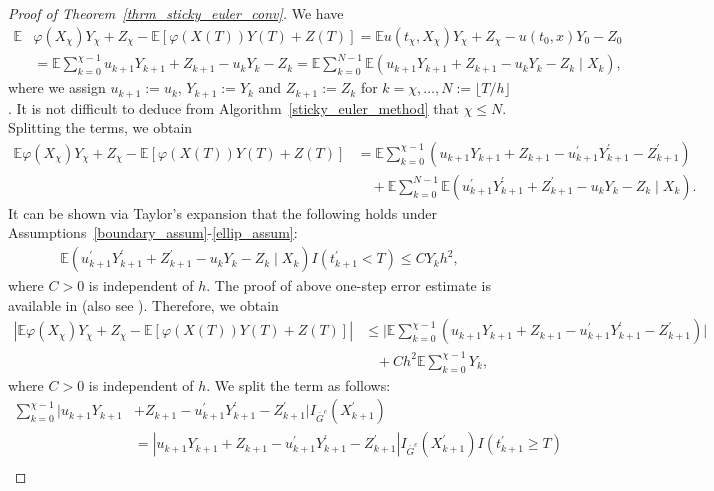 \documentclass{article}
\theoremstyle{definition}
\numberwithin{equation}{section}
\begin{document}
 
\begin{proof}[Proof of Theorem~\ref{thrm_sticky_euler_conv}]
We have
\begin{align*}
    \mathbb{E}&\varphi (X_\chi)Y_{\chi} + Z_{\chi} - \mathbb{E}[\varphi(X(T))Y(T)+ Z(T)] =   \mathbb{E}u(t_\chi, X_{\chi})Y_\chi + Z_{\chi} - u(t_0, x)Y_{0} - Z_{0} 
    \\ & = \mathbb{E}\sum_{k=0}^{\chi -1} u_{k+1}Y_{k+1} + Z_{k+1} - u_{k}Y_{k} - Z_{k}  =  
    \mathbb{E}\sum_{k=0}^{N - 1}
    \mathbb{E} (u_{k+1}Y_{k+1} + Z_{k+1} -u_{k}Y_{k} - Z_{k} \; |\; X_{k}),
\end{align*}
where  we assign $u_{k +1} := u_k$, $Y_{k+1} := Y_k$ and $Z_{k+1} := Z_k$ for $ k = \chi,\dots, N := \lfloor T/h \rfloor$. It is not difficult to deduce from Algorithm~\ref{sticky_euler_method} that $\chi \leq N$. Splitting the terms, we obtain 
\begin{align*}
    \mathbb{E}\varphi (X_\chi)Y_{\chi} + Z_{\chi} - \mathbb{E}[\varphi(X(T))Y(T) + Z(T)] &=  \mathbb{E}\sum_{k=0}^{\chi -1}
 (u_{k+1}Y_{k+1} + Z_{k+1}-u^{'}_{k+1}Y^{'}_{k+1} - Z_{k+1}^{'}) \\  & \quad  +  \mathbb{E}\sum_{k=0}^{N -1}
    \mathbb{E} (u^{'}_{k+1}Y^{'}_{k+1} + Z^{'}_{k+1} -u_{k}Y_{k} - Z_{k} \; |\; X_{k}).
    \end{align*}
It can be shown via Taylor's expansion that the following holds under Assumptions~\ref{boundary_assum}-\ref{ellip_assum}: 
\begin{align}
    \mathbb{E}(u_{k+1}^{'} Y_{k+1}^{'} + Z_{k+1}^{'} - u_{k} Y_{k} - Z_{k} \;|\; X_k)I(t_{k+1}^{'} < T) \leq CY_{k}h^2, \label{one_step_sticky_inside _domain}
\end{align}
where $C >0$ is  independent of $h$. The proof of above one-step error estimate is available in \cite{mil_tretyakov_book} (also see \cite[Lemma~3.2]{leimkuhler2023simplerandom}). Therefore, we obtain
    \begin{align*}
  |\mathbb{E}\varphi (X_\chi)Y_{\chi} + Z_{\chi} - \mathbb{E}[\varphi(X(T))Y(T) + Z(T)]|   &\leq  \bigg|\mathbb{E}\sum_{k=0}^{\chi -1}
     (u_{k+1}Y_{k+1} + Z_{k+1}-u^{'}_{k+1}Y^{'}_{k+1} -Z_{k+1}^{'})\bigg|  \\   &  \;\;\; + Ch^2 \mathbb{E}\sum_{k=0}^{\chi-1}Y_{k},
\end{align*}
where $C >0$ is independent of $h$. We split the term as follows:
\begin{align*}
  \sum_{k=0}^{\chi -1}  |u_{k+1}Y_{k+1} &+ Z_{k+1} - u_{k+1}^{'}Y_{k+1}^{'} - Z_{k+1}^{'}   |I_{\bar{G}^{c}}(X_{k+1}^{'}) 
    \\   & = |u_{k+1}Y_{k+1} + Z_{k+1} - u_{k+1}^{'}Y_{k+1}^{'} - Z_{k+1}^{'}   |I_{\bar{G}^{c}}(X_{k+1}^{'})I(t^{'}_{k+1} \geq T)   \\  

\end{align*}
\end{proof}
\end{document}
